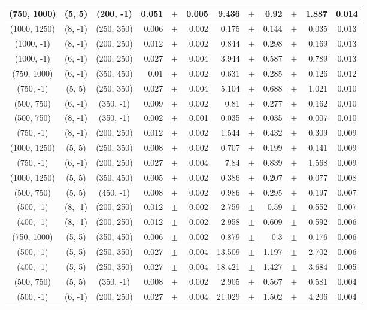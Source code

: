 \documentclass[12pt]{paper}
\begin{document}
\begin{table}[ht]
\begin{center}
{\begin{tabular}{|c|c|c|rrr|rrrrr|c|}
(750, 1000)&(5, 5)&(200, -1)&0.051&$\pm$&0.005&9.436&$\pm$&0.92&$\pm$&1.887&0.014\\\hline
(1000, 1250)&(8, -1)&(250, 350)&0.006&$\pm$&0.002&0.175&$\pm$&0.144&$\pm$&0.035&0.013\\\hline
(1000, -1)&(8, -1)&(200, 250)&0.012&$\pm$&0.002&0.844&$\pm$&0.298&$\pm$&0.169&0.013\\\hline
(1000, -1)&(6, -1)&(200, 250)&0.027&$\pm$&0.004&3.944&$\pm$&0.587&$\pm$&0.789&0.013\\\hline
(750, 1000)&(6, -1)&(350, 450)&0.01&$\pm$&0.002&0.631&$\pm$&0.285&$\pm$&0.126&0.012\\\hline
(750, -1)&(5, 5)&(250, 350)&0.027&$\pm$&0.004&5.104&$\pm$&0.688&$\pm$&1.021&0.010\\\hline
(500, 750)&(6, -1)&(350, -1)&0.009&$\pm$&0.002&0.81&$\pm$&0.277&$\pm$&0.162&0.010\\\hline
(500, 750)&(8, -1)&(350, -1)&0.002&$\pm$&0.001&0.035&$\pm$&0.035&$\pm$&0.007&0.010\\\hline
(750, -1)&(8, -1)&(200, 250)&0.012&$\pm$&0.002&1.544&$\pm$&0.432&$\pm$&0.309&0.009\\\hline
(1000, 1250)&(5, 5)&(250, 350)&0.008&$\pm$&0.002&0.707&$\pm$&0.199&$\pm$&0.141&0.009\\\hline
(750, -1)&(6, -1)&(200, 250)&0.027&$\pm$&0.004&7.84&$\pm$&0.839&$\pm$&1.568&0.009\\\hline
(1000, 1250)&(5, 5)&(350, 450)&0.005&$\pm$&0.002&0.386&$\pm$&0.207&$\pm$&0.077&0.008\\\hline
(500, 750)&(5, 5)&(450, -1)&0.008&$\pm$&0.002&0.986&$\pm$&0.295&$\pm$&0.197&0.007\\\hline
(500, -1)&(8, -1)&(200, 250)&0.012&$\pm$&0.002&2.759&$\pm$&0.59&$\pm$&0.552&0.007\\\hline
(400, -1)&(8, -1)&(200, 250)&0.012&$\pm$&0.002&2.958&$\pm$&0.609&$\pm$&0.592&0.006\\\hline
(750, 1000)&(5, 5)&(350, 450)&0.006&$\pm$&0.002&0.879&$\pm$&0.3&$\pm$&0.176&0.006\\\hline
(500, -1)&(5, 5)&(250, 350)&0.027&$\pm$&0.004&13.509&$\pm$&1.197&$\pm$&2.702&0.006\\\hline
(400, -1)&(5, 5)&(250, 350)&0.027&$\pm$&0.004&18.421&$\pm$&1.427&$\pm$&3.684&0.005\\\hline
(500, 750)&(5, 5)&(350, -1)&0.008&$\pm$&0.002&2.905&$\pm$&0.567&$\pm$&0.581&0.004\\\hline
(500, -1)&(6, -1)&(200, 250)&0.027&$\pm$&0.004&21.029&$\pm$&1.502&$\pm$&4.206&0.004\\\hline

\end{tabular}}
\end{center}
\end{table}
\end{document}
